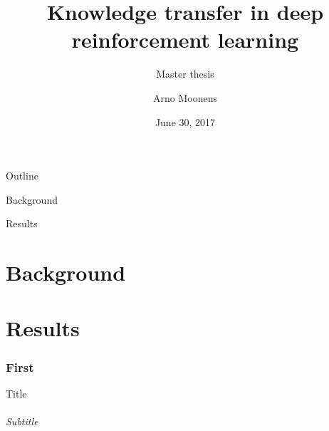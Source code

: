 \documentclass{beamer}
\title{Knowledge transfer in deep reinforcement learning}
\subtitle{Master thesis}
\author{Arno Moonens}
\date{June 30, 2017}
\begin{document}
\frame{\titlepage}

\begin{frame}{Outline}

  {\color{vubbleu}\large Background}
  \tableofcontents[part=1]

  {\color{vubbleu}\large Results}
  \tableofcontents[part=2]
\end{frame}

\part{Background}

\part{Results}
\section{First}

\begin{frame}[fragile]{Title}
\framesubtitle{Subtitle}

\end{frame}
\end{document}
